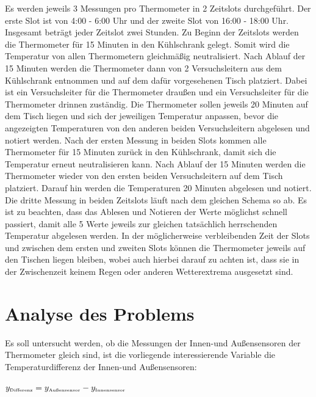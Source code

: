 \documentclass[ ngerman, fontsize= 12pt, paper=a4, headings=big, titlepage=true]{article}
\begin{document}
	Es werden jeweils 3 Messungen pro Thermometer in 2 Zeitslots durchgeführt. Der erste Slot ist von 4:00 - 6:00 Uhr und der zweite Slot von 16:00 - 18:00 Uhr. Insgesamt beträgt jeder Zeitslot zwei Stunden. Zu Beginn der Zeitslots werden die Thermometer für 15 Minuten in den Kühlschrank gelegt. Somit wird die Temperatur von allen Thermometern gleichmäßig neutralisiert. Nach Ablauf der 15 Minuten werden die Thermometer dann von 2 Versuchsleitern aus dem Kühlschrank entnommen und auf dem dafür vorgesehenen Tisch platziert. Dabei ist ein Versuchsleiter für die Thermometer draußen und ein Versuchsleiter für die Thermometer drinnen zuständig. Die Thermometer sollen jeweils 20 Minuten auf dem Tisch liegen und sich der jeweiligen Temperatur anpassen, bevor die angezeigten Temperaturen von den anderen beiden Versuchsleitern abgelesen und notiert werden. Nach der ersten Messung in beiden Slots kommen alle Thermometer für 15 Minuten zurück in den Kühlschrank, damit sich die Temperatur erneut neutralisieren kann. Nach Ablauf der 15 Minuten werden die Thermometer wieder von den ersten beiden Versuchsleitern auf dem Tisch platziert. Darauf hin werden die Temperaturen 20 Minuten abgelesen und notiert. Die dritte Messung in beiden Zeitslots läuft nach dem gleichen Schema so ab. Es ist zu beachten, dass das Ablesen und Notieren der Werte möglichst schnell passiert, damit alle 5 Werte jeweils zur gleichen tatsächlich herrschenden Temperatur abgelesen werden. In der möglicherweise verbleibenden Zeit der Slots und zwischen dem ersten und zweiten Slots können die Thermometer jeweils auf den Tischen liegen bleiben, wobei auch hierbei darauf zu achten ist, dass sie in der Zwischenzeit keinem Regen oder anderen Wetterextrema ausgesetzt sind.
	
	
	
	\section{Analyse des Problems}
	
	Es soll untersucht werden, ob die Messungen der Innen-und Außensensoren der Thermometer gleich sind, ist die vorliegende interessierende Variable die Temperaturdifferenz der Innen-und Außensensoren:\\
	\begin{center}
		$y_{\text{\tiny{Differenz}}} = y_{\text{\tiny{Außensensor}}}-y_{\text{\tiny{Innensensor}}} $
	\end{center}
	
\end{document}

